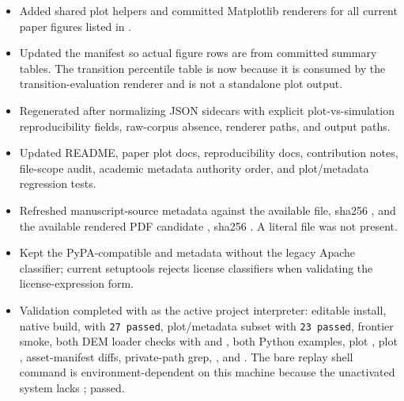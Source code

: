 \begin{itemize}
\item Added shared plot helpers and committed Matplotlib renderers for all current paper figures listed in \texttt{}.
\item Updated the manifest so actual figure rows are \texttt{} from committed summary tables. The transition percentile table is now \texttt{} because it is consumed by the transition-evaluation renderer and is not a standalone plot output.
\item Regenerated \texttt{} after normalizing JSON sidecars with explicit plot-vs-simulation reproducibility fields, raw-corpus absence, renderer paths, and output paths.
\item Updated README, paper plot docs, reproducibility docs, contribution notes, file-scope audit, academic metadata authority order, and plot/metadata regression tests.
\item Refreshed manuscript-source metadata against the available \texttt{} file, sha256 \texttt{}, and the available rendered PDF candidate \texttt{}, sha256 \texttt{}. A literal \texttt{} file was not present.
\item Kept the PyPA-compatible \texttt{} and \texttt{} metadata without the legacy Apache classifier; current setuptools rejects license classifiers when validating the license-expression form.
\item Validation completed with \texttt{} as the active project interpreter: editable install, native build, \texttt{} with \texttt{27 passed}, plot/metadata subset with \texttt{23 passed}, frontier smoke, both DEM loader checks with \texttt{} and \texttt{}, both Python examples, plot \texttt{}, plot \texttt{}, asset-manifest diffs, private-path grep, \texttt{}, and \texttt{}. The bare replay shell command is environment-dependent on this machine because the unactivated system \texttt{} lacks \texttt{}; \texttt{} passed.
\end{itemize}

